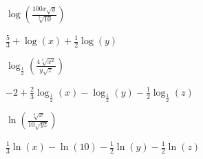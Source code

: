 \documentclass{ximera}
\begin{document}
\begin{question}
\begin{problem}
    $\log\left(\frac{100x\sqrt{y}}{\sqrt[3]{10}}\right)$

\begin{solution}
$\frac{5}{3}+\log(x)+\frac{1}{2}\log(y)$
\end{solution}
\end{problem} 

\begin{problem}
    $\log_{\frac{1}{2}}\left(\frac{4\sqrt[3]{x^2}}{y\sqrt{z}}\right)$

    \begin{solution}
        $-2+\frac{2}{3}\log_{\frac{1}{2}}(x)-\log_{\frac{1}{2}}(y)-\frac{1}{2}\log_{\frac{1}{2}}(z)$
    \end{solution}
\end{problem}

\begin{problem}\label{expandloglast}
    $\ln \left(\frac{\sqrt[3]{x}}{10 \sqrt{yz}}\right)$

\begin{solution}
$\frac{1}{3} \ln(x) - \ln(10) - \frac{1}{2}\ln(y)-\frac{1}{2}\ln(z)$
\end{solution}
\end{problem}

\end{question}
\end{document}
